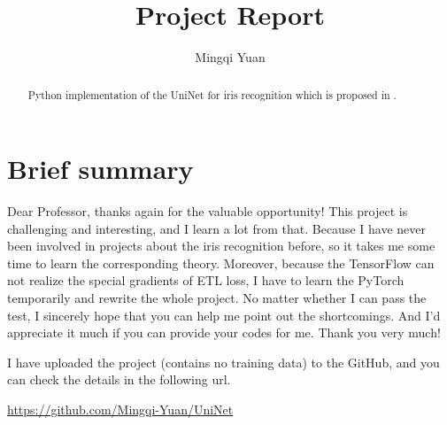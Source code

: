 \documentclass{article}
\title{Project Report}
\author{Mingqi Yuan}
\date{}
\begin{document}
\maketitle

\begin{abstract}
	Python implementation of the UniNet for iris recognition which is proposed in \cite{zhao2017towards}.
\end{abstract}



\section{Brief summary}
Dear Professor, thanks again for the valuable opportunity! This project is challenging and interesting, and I learn a lot from that. Because I have never been involved in projects about the iris recognition before, so it takes me some time to learn the corresponding theory. Moreover, because the TensorFlow can not realize the special gradients of ETL loss, I have to learn the PyTorch temporarily and rewrite the whole project. No matter whether I can pass the test, I sincerely hope that you can help me point out the shortcomings. And I'd appreciate it much if you can provide your codes for me. Thank you very much!

I have uploaded the project (contains no training data) to the GitHub, and you can check the details in the following url.

\textcolor{blue}{\url{https://github.com/Mingqi-Yuan/UniNet}}
\end{document}
